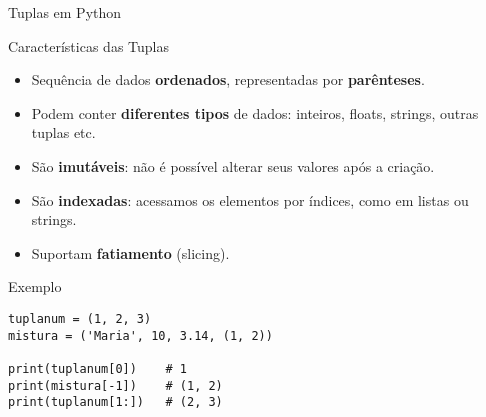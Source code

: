 \begin{frame}[fragile]{Tuplas em Python}

    \begin{block}{Características das Tuplas}
        \begin{itemize}
            \item Sequência de dados \textbf{ordenados}, representadas por \textbf{parênteses}.
            \item Podem conter \textbf{diferentes tipos} de dados: inteiros, floats, strings, outras tuplas etc.
            \item São \textbf{imutáveis}: não é possível alterar seus valores após a criação.
            \item São \textbf{indexadas}: acessamos os elementos por índices, como em listas ou strings.
            \item Suportam \textbf{fatiamento} (slicing).
        \end{itemize}
    \end{block}

    \vspace{0.5em}

    \begin{block}{Exemplo}
        \begin{verbatim}
tuplanum = (1, 2, 3)
mistura = ('Maria', 10, 3.14, (1, 2))

print(tuplanum[0])    # 1
print(mistura[-1])    # (1, 2)
print(tuplanum[1:])   # (2, 3)
\end{verbatim}
    \end{block}

\end{frame}


